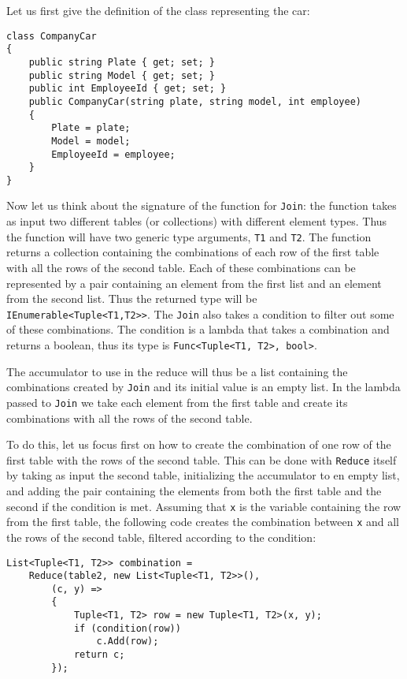 Let us first give the definition of the class representing the car:

\begin{lstlisting}
class CompanyCar
{
	public string Plate { get; set; }
	public string Model { get; set; }
	public int EmployeeId { get; set; }
	public CompanyCar(string plate, string model, int employee)
	{
		Plate = plate;
		Model = model;
		EmployeeId = employee;
	}
}
\end{lstlisting}

\noindent
Now let us think about the signature of the function for \texttt{Join}: the function takes as input two different tables (or collections) with different element types. Thus the function will have two generic type arguments, \texttt{T1} and \texttt{T2}. The function returns a collection containing the combinations of each row of the first table with all the rows of the second table. Each of these combinations can be represented by a pair containing an element from the first list and an element from the second list. Thus the returned type will be \texttt{IEnumerable<Tuple<T1,T2>>}. The \texttt{Join} also takes a condition to filter out some of these combinations. The condition is a lambda that takes a combination and returns a boolean, thus its type is \texttt{Func<Tuple<T1, T2>, bool>}.

The accumulator to use in the reduce will thus be a list containing the combinations created by \texttt{Join} and its initial value is an empty list. In the lambda passed to \texttt{Join} we take each element from the first table and create its combinations with all the rows of the second table.

To do this, let us focus first on how to create the combination of one row of the first table with the rows of the second table. This can be done with \texttt{Reduce} itself by taking as input the second table, initializing the accumulator to en empty list, and adding the pair containing the elements from both the first table and the second if the condition is met. Assuming that \texttt{x} is the variable containing the row from the first table, the following code creates the combination between \texttt{x} and all the rows of the second table, filtered according to the condition:

\begin{lstlisting}
List<Tuple<T1, T2>> combination =
	Reduce(table2, new List<Tuple<T1, T2>>(),
		(c, y) =>
		{
			Tuple<T1, T2> row = new Tuple<T1, T2>(x, y);
			if (condition(row))
				c.Add(row);
			return c;
		});
\end{lstlisting}

